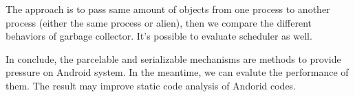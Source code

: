 \documentclass[11pt]{article}
\begin{document}
The approach is to pass same amount of objects from one process to another process (either the same process or alien),
then we compare the different behaviors of garbage collector.
It's possible to evaluate scheduler as well.

In conclude, the parcelable and serializable mechanisms are methods to provide pressure on Android system.
In the meantime, we can evalute the performance of them.
The result may improve static code analysis of Andorid codes.
\end{document}
